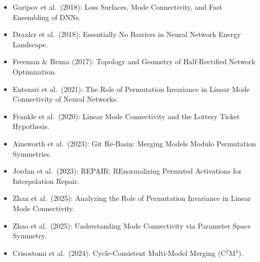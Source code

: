 \documentclass[11pt,a4paper]{article}
\begin{document}
\begin{itemize}
    \item Garipov et al.\ (2018): Loss Surfaces, Mode Connectivity, and Fast Ensembling of DNNs.
    \item Draxler et al.\ (2018): Essentially No Barriers in Neural Network Energy Landscape.
    \item Freeman \& Bruna (2017): Topology and Geometry of Half-Rectified Network Optimization.
    \item Entezari et al.\ (2021): The Role of Permutation Invariance in Linear Mode Connectivity of Neural Networks.
    \item Frankle et al.\ (2020): Linear Mode Connectivity and the Lottery Ticket Hypothesis.
    \item Ainsworth et al.\ (2023): Git Re-Basin: Merging Models Modulo Permutation Symmetries.
    \item Jordan et al.\ (2023): REPAIR: REnormalizing Permuted Activations for Interpolation Repair.
    \item Zhan et al.\ (2025): Analyzing the Role of Permutation Invariance in Linear Mode Connectivity.
    \item Zhao et al.\ (2025): Understanding Mode Connectivity via Parameter Space Symmetry.
    \item Crisostomi et al.\ (2024): Cycle-Consistent Multi-Model Merging (C$^2$M$^3$).
\end{itemize}
\end{document}
